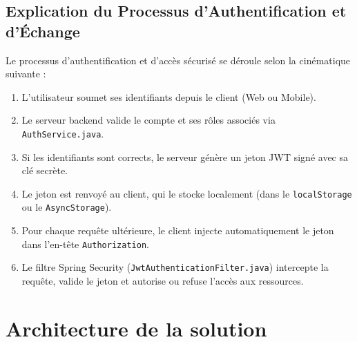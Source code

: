 \subsection{Explication du Processus d'Authentification et d'Échange}
Le processus d'authentification et d'accès sécurisé se déroule selon la cinématique suivante :
\begin{enumerate}
    \item L'utilisateur soumet ses identifiants depuis le client (Web ou Mobile).
    \item Le serveur backend valide le compte et ses rôles associés via \texttt{AuthService.java}.
    \item Si les identifiants sont corrects, le serveur génère un jeton JWT signé avec sa clé secrète.
    \item Le jeton est renvoyé au client, qui le stocke localement (dans le \texttt{localStorage} ou le \texttt{AsyncStorage}).
    \item Pour chaque requête ultérieure, le client injecte automatiquement le jeton dans l'en-tête \texttt{Authorization}.
    \item Le filtre Spring Security (\texttt{JwtAuthenticationFilter.java}) intercepte la requête, valide le jeton et autorise ou refuse l'accès aux ressources.
\end{enumerate}

\section{Architecture de la solution}
\label{sec:architecture_solution}

